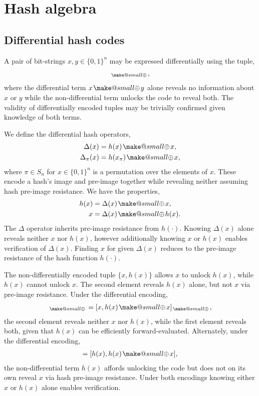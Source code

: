 \documentclass[twocolumn, aps, amsmath, amssymb, nofootinbib, superscriptaddress, longbibliography, doublefloatfix, table-of-contents, eqsecnum, rmp]{revtex4-2}
\makeatletter
\newcommand{\soplus}{{{\hspace{1pt}}{\mathbin{\mathpalette\make@small{\mathbin\oplus}}}}{\hspace{1pt}}}
\newcommand{\make@small}[2]{%
  \vcenter{\hbox{%
    \scalebox{0.6}{$\m@th#1#2$}%
  }}%
}
\makeatother
\begin{document}
\section{Hash algebra}

\subsection{Differential hash codes}

A pair of bit-strings $x,y\in\{0,1\}^n$ may be expressed differentially using the tuple,
\begin{align}
	[x,x\soplus y]_\soplus,
\end{align}
where the differential term $x\soplus y$ alone reveals no information about $x$ or $y$ while the non-differential term unlocks the code to reveal both. The validity of differentially encoded tuples may be trivially confirmed given knowledge of both terms.

We define the differential hash operators,
\begin{align}
	\Delta(x) &= h(x)\soplus x,\nonumber\\
	\Delta_\pi(x) &= h(x_\pi)\soplus x,
\end{align}
where $\pi\in S_n$ for $x\in\{0,1\}^n$ is a permutation over the elements of $x$. These encode a hash's image and pre-image together while revealing neither assuming hash pre-image resistance. We have the properties,
\begin{align}
	h(x) &= \Delta(x) \soplus x,\nonumber\\
	x &= \Delta(x) \soplus h(x).
\end{align}
The $\Delta$ operator inherits pre-image resistance from $h(\cdot)$. Knowing $\Delta(x)$ alone reveals neither $x$ nor $h(x)$, however additionally knowing $x$ or $h(x)$ enables verification of $\Delta(x)$. Finding $x$ for given $\Delta(x)$ reduces to the pre-image resistance of the hash function $h(\cdot)$.

The non-differentially encoded tuple $\{x,h(x)\}$ allows $x$ to unlock $h(x)$, while $h(x)$ cannot unlock $x$. The second element reveals $h(x)$ alone, but not $x$ via pre-image resistance. Under the differential encoding,
\begin{align}
	[x,\Delta(x)]_\soplus =[x,h(x)\soplus x]_\soplus,
\end{align}
the second element reveals neither $x$ nor $h(x)$, while the first element reveals both, given that $h(x)$ can be efficiently forward-evaluated. Alternately, under the differential encoding,
\begin{align}
	[h(x),\Delta(x)] = [h(x),h(x)\soplus x],
\end{align}
the non-differential term $h(x)$ affords unlocking the code but does not on its own reveal $x$ via hash pre-image resistance. Under both encodings knowing either $x$ or $h(x)$ alone enables verification.
\end{document}

